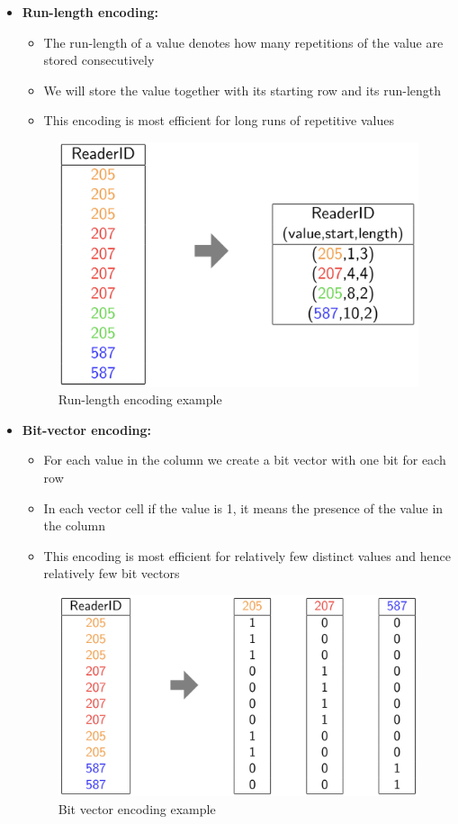 \begin{itemize}
    \item \textbf{Run-length encoding:}
    \begin{itemize}
        \item The run-length of a value denotes how many repetitions of the value are stored consecutively
        \item We will store the value together with its starting row and its run-length
        \item This encoding is most efficient for long runs of repetitive values
    \end{itemize}
    \begin{figure}[!hbp]
        \centering
        \includegraphics[width=0.60\linewidth]{images/AdvancedDataManagment/column_stores/run-length_encoding.jpeg}
        \caption{Run-length encoding example}
    \end{figure}
        
    
    \item \textbf{Bit-vector encoding:} 
    \begin{itemize}
        \item For each value in the column we create a bit vector with one bit for each row
        \item In each vector cell if the value is 1, it means the presence of the value in the column
        \item This encoding is most efficient for relatively few distinct values and hence relatively few bit vectors
    \end{itemize}
    
    
    \begin{figure}[!hbp]
        \centering
        \includegraphics[width=0.60\linewidth]{images/AdvancedDataManagment/column_stores/bit_vector_encoding.jpeg}
        \caption{Bit vector encoding example}
    \end{figure}
    

\end{itemize}
